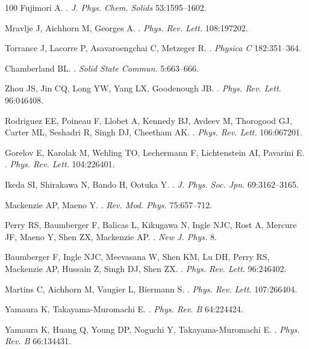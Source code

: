 \documentclass[]{ar2e-changed}%
\begin{document}
\begin{thebibliography}{100}
Fujimori A.
.
\newblock \emph{J. Phys. Chem. Solids} 53:1595--1602.

Mravlje J, Aichhorn M, Georges A.
.
\newblock \emph{Phys. Rev. Lett.} 108:197202.

Torrance J, Lacorre P, Asavaroengchai C, Metzeger R.
.
\newblock \emph{Physica C} 182:351--364.

Chamberland BL.
.
\newblock \emph{Solid State Commun.} 5:663--666.

Zhou JS, Jin CQ, Long YW, Yang LX, Goodenough JB.
.
\newblock \emph{Phys. Rev. Lett.} 96:046408.

Rodriguez EE, Poineau F, Llobet A, Kennedy BJ, Avdeev M, Thorogood GJ, Carter
  ML, Seshadri R, Singh DJ, Cheetham AK.
.
\newblock \emph{Phys. Rev. Lett.} 106:067201.

Gorelov E, Karolak M, Wehling TO, Lechermann F, Lichtenstein AI, Pavarini E.
.
\newblock \emph{Phys. Rev. Lett.} 104:226401.

Ikeda SI, Shirakawa N, Bando H, Ootuka Y.
.
\newblock \emph{J. Phys. Soc. Jpn.} 69:3162--3165.

Mackenzie AP, Maeno Y.
.
\newblock \emph{Rev. Mod. Phys.} 75:657--712.

Perry RS, Baumberger F, Balicas L, Kikugawa N, Ingle NJC, Rost A, Mercure JF,
  Maeno Y, Shen ZX, Mackenzie AP.
.
\newblock \emph{New J. Phys.} 8.

Baumberger F, Ingle NJC, Meevasana W, Shen KM, Lu DH, Perry RS, Mackenzie AP,
  Hussain Z, Singh DJ, Shen ZX.
.
\newblock \emph{Phys. Rev. Lett.} 96:246402.

Martins C, Aichhorn M, Vaugier L, Biermann S.
.
\newblock \emph{Phys. Rev. Lett.} 107:266404.

Yamaura K, Takayama-Muromachi E.
.
\newblock \emph{Phys. Rev. B} 64:224424.

Yamaura K, Huang Q, Young DP, Noguchi Y, Takayama-Muromachi E.
.
\newblock \emph{Phys. Rev. B} 66:134431.


\end{thebibliography}
\end{document}

